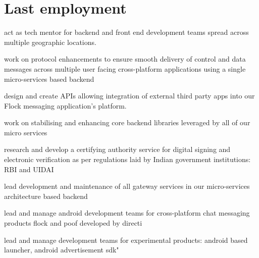 \begin{minipage}[t]{0.66\textwidth} %


\section{Last employment}

\vspace{\topsep} %
\begin{tightitemize}
\item act as tech mentor for backend and front end development teams spread across multiple geographic locations.
\item work on protocol enhancements to ensure smooth delivery of control and data messages across multiple user facing cross-platform applications using a single micro-services based backend
\item design and create APIs allowing integration of external third party apps into our Flock messaging application's platform.
\item work on stabilising and enhancing core backend libraries leveraged by all of our micro services
\end{tightitemize}

\sectionspace %


\begin{tightitemize}
\item research and develop a certifying authority service for digital signing and electronic verification as per regulations laid by Indian government institutions: RBI and UIDAI
\item lead development and maintenance of all gateway services in our micro-services architecture based backend
\end{tightitemize}

\sectionspace %


\begin{tightitemize}
\item lead and manage android development teams for cross-platform chat messaging products flock and poof developed by directi
\item lead and manage development teams for experimental products: android based launcher, android advertisement sdk"
\end{tightitemize}


\end{minipage}
